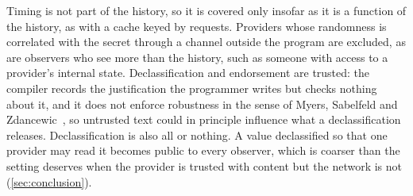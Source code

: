 Timing is not part of the history, so it is covered only insofar as it is a
function of the history, as with a cache keyed by requests. Providers whose
randomness is correlated with the secret through a channel outside the program are
excluded, as are observers who see more than the history, such as someone with
access to a provider's internal state. Declassification and endorsement are
trusted: the compiler records the justification the programmer writes but checks
nothing about it, and it does not enforce robustness in the sense of Myers,
Sabelfeld and Zdancewic~\cite{Myers2006Robust}, so untrusted text could in
principle influence what a declassification releases. Declassification is also all
or nothing. A value declassified so that one provider may read it becomes public to
every observer, which is coarser than the setting deserves when the provider is
trusted with content but the network is not (\cref{sec:conclusion}).
